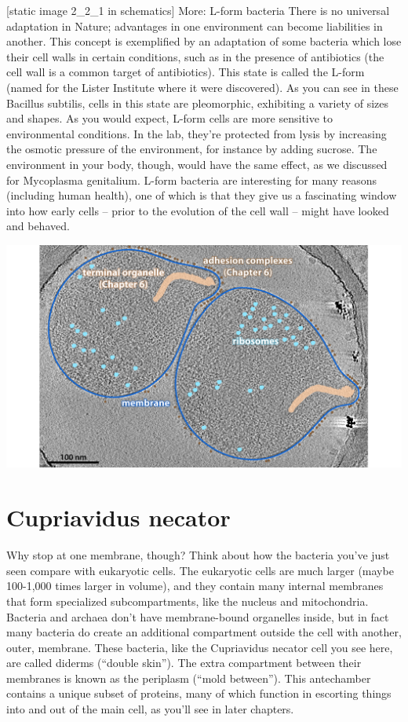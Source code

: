 \documentclass[]{tufte-book}
\begin{document}
{[}static image 2\_2\_1 in schematics{]} More: L-form bacteria There is
no universal adaptation in Nature; advantages in one environment can
become liabilities in another. This concept is exemplified by an
adaptation of some bacteria which lose their cell walls in certain
conditions, such as in the presence of antibiotics (the cell wall is a
common target of antibiotics). This state is called the L-form (named
for the Lister Institute where it were discovered). As you can see in
these Bacillus subtilis, cells in this state are pleomorphic, exhibiting
a variety of sizes and shapes. As you would expect, L-form cells are
more sensitive to environmental conditions. In the lab, they're
protected from lysis by increasing the osmotic pressure of the
environment, for instance by adding sucrose. The environment in your
body, though, would have the same effect, as we discussed for Mycoplasma
genitalium. L-form bacteria are interesting for many reasons (including
human health), one of which is that they give us a fascinating window
into how early cells -- prior to the evolution of the cell wall -- might
have looked and behaved.

\includegraphics{img/02_static/2_1_Mgenitalium}

\section{Cupriavidus necator}\label{cupriavidus-necator}

Why stop at one membrane, though? Think about how the bacteria you've
just seen compare with eukaryotic cells. The eukaryotic cells are much
larger (maybe 100-1,000 times larger in volume), and they contain many
internal membranes that form specialized subcompartments, like the
nucleus and mitochondria. Bacteria and archaea don't have membrane-bound
organelles inside, but in fact many bacteria do create an additional
compartment outside the cell with another, outer, membrane. These
bacteria, like the Cupriavidus necator cell you see here, are called
diderms (``double skin''). The extra compartment between their membranes
is known as the periplasm (``mold between''). This antechamber contains
a unique subset of proteins, many of which function in escorting things
into and out of the main cell, as you'll see in later chapters.
\end{document}
